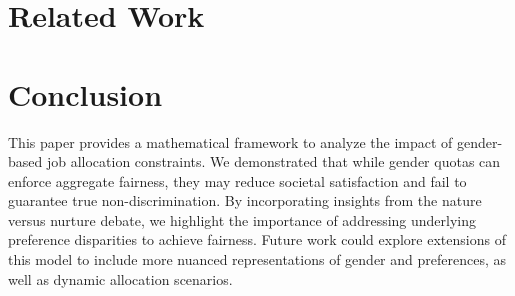 \documentclass[letterpaper]{article}
\begin{document}
\section{Related Work}


\section{Conclusion}
This paper provides a mathematical framework to analyze the impact of gender-based job allocation constraints. We demonstrated that while gender quotas can enforce aggregate fairness, they may reduce societal satisfaction and fail to guarantee true non-discrimination. By incorporating insights from the nature versus nurture debate, we highlight the importance of addressing underlying preference disparities to achieve fairness. Future work could explore extensions of this model to include more nuanced representations of gender and preferences, as well as dynamic allocation scenarios.

\bigskip


\end{document}
